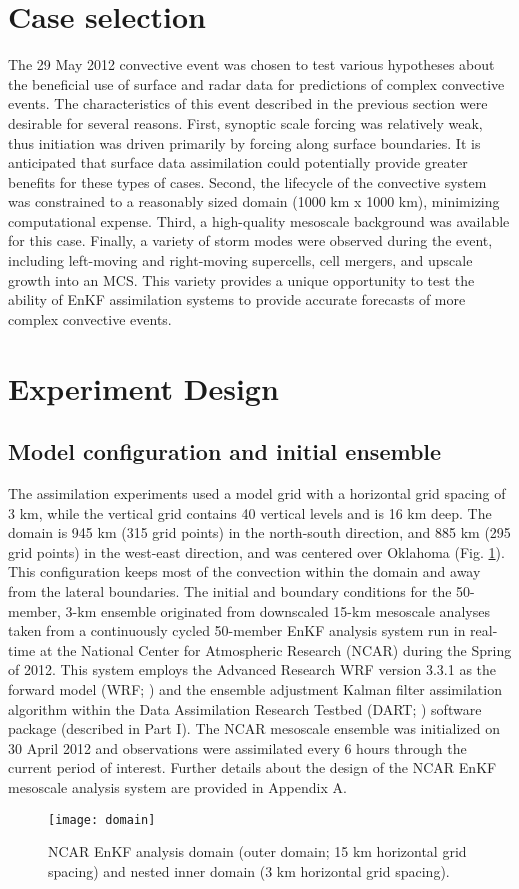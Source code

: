 \section{Case selection}
The 29 May 2012 convective event was chosen to test various hypotheses about the beneficial use of surface and radar data for predictions of complex convective events. The characteristics of this event described in the previous section were desirable for several reasons. First, synoptic scale forcing was relatively weak, thus initiation was driven primarily by forcing along surface boundaries. It is anticipated that surface data assimilation could potentially provide greater benefits for these types of cases. Second, the lifecycle of the convective system was constrained to a reasonably sized domain (1000 km x 1000 km), minimizing computational expense. Third, a high-quality mesoscale background was available for this case. Finally, a variety of storm modes were observed during the event, including left-moving and right-moving supercells, cell mergers, and upscale growth into an MCS. This variety provides a unique opportunity to test the ability of EnKF assimilation systems to provide accurate forecasts of more complex convective events.

\pagebreak
\section{Experiment Design}
\subsection{Model configuration and initial ensemble}
The assimilation experiments used a model grid with a horizontal grid spacing of 3 km, while the vertical grid contains 40 vertical levels and is 16 km deep. The domain is 945 km (315 grid points) in the north-south direction, and 885 km (295 grid points) in the west-east direction, and was centered over Oklahoma (Fig. \ref{domain}). This configuration keeps most of the convection within the domain and away from the lateral boundaries. The initial and boundary conditions for the 50-member, 3-km ensemble originated from downscaled 15-km mesoscale analyses taken from a continuously cycled 50-member EnKF analysis system run in real-time at the National Center for Atmospheric Research (NCAR) during the Spring of 2012. This system employs the Advanced Research WRF version 3.3.1 as the forward model (WRF; \citealt{skamarocketal08}) and the ensemble adjustment Kalman filter assimilation algorithm within the Data Assimilation Research Testbed (DART; \citealt{andersonetal09}) software package (described in Part I). The NCAR mesoscale ensemble was initialized on 30 April 2012 and observations were assimilated every 6 hours through the current period of interest. Further details about the design of the NCAR EnKF mesoscale analysis system are provided in Appendix A.
\begin{figure}
\centering
\texttt{[image: domain]}
\caption{NCAR EnKF analysis domain (outer domain; 15 km horizontal grid spacing) and nested inner domain (3 km horizontal grid spacing).}
\label{domain}
\end{figure}

